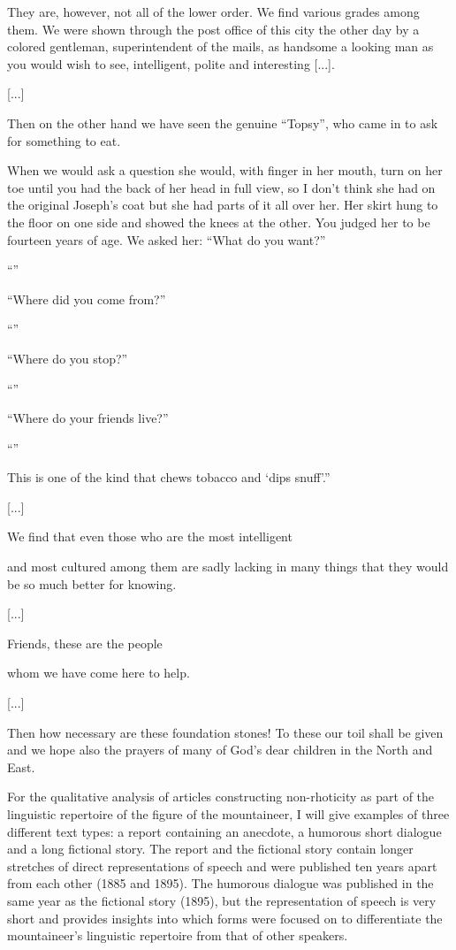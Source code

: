 \begin{ipquote}
{They are, however, not all of the lower order. We find various grades among them. We were shown through the post office of this city the other day by a colored gentleman, superintendent of the mails, as handsome a looking man as you would wish to see, intelligent, polite and interesting [...].

\centering
{[...]}

Then on the other hand we have seen the genuine “Topsy”, who came in to ask for something to eat.} {When we would ask a question she would, with finger in her mouth, turn on her to{\kern0pt}e until you had the back of her head in full view, so I don’t think she had on the original Joseph’s coat but she had parts of it all over her. Her skirt hung to the floor on one side and showed the knees at the other. You judged her to be fourteen years of age. We asked her: “What do you want?”

“”

“Where did you come from?”

“”

“Where do you stop?”

“”

“Where do your friends live?”

“”

This is one of the kind that chews tobacco and ‘dips snuff’.”

\centering
{[...]}

We find that even those who are the most intelligent} {and most cultured among them are sadly lacking in many things that they would be so much better for knowing.

\centering
{[...]}

Friends, these are the people} {whom we have come here to help.

\centering
{[...]}

Then how necessary are these foundation stones! To these our toil shall be given and we hope also the prayers of many of God’s dear children in the North and East.}
\end{ipquote}

For the qualitative analysis of articles constructing non-rhoticity as part of the linguistic repertoire of the figure of the mountaineer, I will give examples of three different text types: a report containing an anecdote, a humorous short dialogue and a long fictional story. The report and the fictional story contain longer stretches of direct representations of speech and were published ten years apart from each other (1885 and 1895). The humorous dialogue was published in the same year as the fictional story (1895), but the representation of speech is very short and provides insights into which forms were focused on to differentiate the mountaineer’s linguistic repertoire from that of other speakers.

